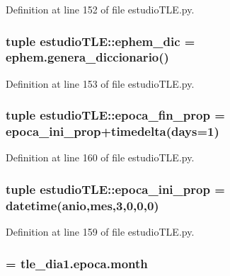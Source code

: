 \-Definition at line 152 of file estudio\-T\-L\-E.\-py.

\subsubsection[{ephem\-\_\-dic}]{\setlength{\rightskip}{0pt plus 5cm}tuple {\bf estudio\-T\-L\-E\-::ephem\-\_\-dic} = ephem.\-genera\-\_\-diccionario()}\label{namespaceestudio_t_l_e_a70df421239bd23b05dbfcc944f5aaeb5}


\-Definition at line 153 of file estudio\-T\-L\-E.\-py.

\subsubsection[{epoca\-\_\-fin\-\_\-prop}]{\setlength{\rightskip}{0pt plus 5cm}tuple {\bf estudio\-T\-L\-E\-::epoca\-\_\-fin\-\_\-prop} = {\bf epoca\-\_\-ini\-\_\-prop}+timedelta(days=1)}\label{namespaceestudio_t_l_e_a8e8d7ab6b2220b2de3821e828c938898}


\-Definition at line 160 of file estudio\-T\-L\-E.\-py.

\subsubsection[{epoca\-\_\-ini\-\_\-prop}]{\setlength{\rightskip}{0pt plus 5cm}tuple {\bf estudio\-T\-L\-E\-::epoca\-\_\-ini\-\_\-prop} = datetime({\bf anio},{\bf mes},3,0,0,0)}\label{namespaceestudio_t_l_e_a61370b9373ad741def7ba9794aaa0b6a}


\-Definition at line 159 of file estudio\-T\-L\-E.\-py.

\subsubsection[{mes}]{ = tle\-\_\-dia1.\-epoca.\-month}\label{namespaceestudio_t_l_e_a0e597f6e5f7488399ac4c42273aa6615}



